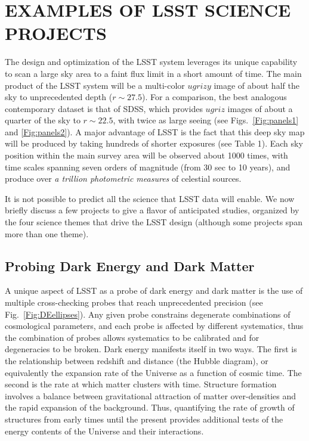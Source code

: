 
\section{  EXAMPLES OF LSST SCIENCE PROJECTS                    }
\label{Sec:science}

The design and optimization of the LSST system leverages its unique capability
to scan a large sky area to a faint flux limit in a short amount of time.
The main product of the LSST system will be a multi-color $ugrizy$ image of about
half the sky to unprecedented depth ($r\sim27.5$). For a comparison, the best
analogous contemporary dataset is that of SDSS, which provides $ugriz$ images
of about a quarter of the sky to $r\sim22.5$, with twice as large seeing
(see Figs.~\ref{Fig:panels1} and \ref{Fig:panels2}). A major advantage of LSST
is the fact that this deep sky map will be produced by taking hundreds of
shorter exposures (see Table 1). Each sky position within the main survey area
will be observed about 1000 times, with time scales spanning seven orders of
magnitude (from 30 sec to 10 years), and produce over {\it a trillion
photometric measures} of celestial sources.

It is not possible to predict all the science that LSST data will enable.
We now briefly discuss a few projects to give a flavor of anticipated studies,
organized by the four science themes that drive the LSST design
(although some projects span more than one theme).


\vskip 0.3in
\subsection{Probing Dark Energy and Dark Matter }

A unique aspect of LSST as a probe of dark energy and dark matter is
the use of multiple cross-checking probes that reach unprecedented
precision (see Fig.~\ref{Fig:DEellipses}). Any given probe constrains
degenerate combinations of cosmological parameters, and each probe is
affected by different systematics, thus the combination of probes
allows systematics to be calibrated and for degeneracies to be
broken.  Dark energy manifests itself in two ways.  The first is the
relationship between redshift and distance (the Hubble diagram), or
equivalently the expansion rate of the Universe as a function of
cosmic time.  The second is the rate at which matter clusters with
time.
Structure formation involves a balance between
gravitational attraction of matter over-densities and the rapid
expansion of the background.  Thus, quantifying the rate of growth of
structures from early times until the present provides additional
tests of the energy contents of the Universe and their interactions.

